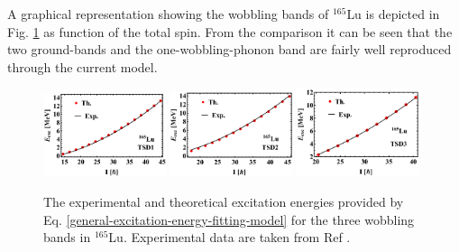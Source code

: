 A graphical representation showing the wobbling bands of $^{165}$Lu is depicted in Fig. \ref{excitation-energies-th-165Lu} as function of the total spin. From the comparison it can be seen that the two ground-bands and the one-wobbling-phonon band are fairly well reproduced through the current model.
\begin{figure}
    \centering
    \includegraphics[width=0.32\textwidth]{Chapters/Figures/Lu-exp-energies/fig4a_lu165.pdf}
    \includegraphics[width=0.32\textwidth]{Chapters/Figures/Lu-exp-energies/fig4b_lu165.pdf}
    \includegraphics[width=0.32\textwidth]{Chapters/Figures/Lu-exp-energies/fig4c_lu165.pdf}
    \caption{The experimental and theoretical excitation energies provided by Eq. \ref{general-excitation-energy-fitting-model} for the three wobbling bands in $^{165}$Lu. Experimental data are taken from Ref \cite{schonwasser2003one}.}
    \label{excitation-energies-th-165Lu}
\end{figure}

